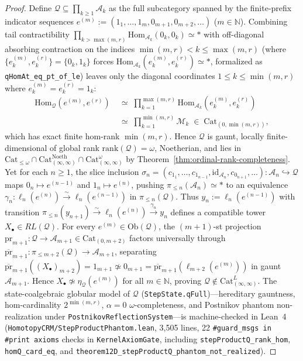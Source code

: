 \documentclass[10pt,twoside,openright]{book}
\theoremstyle{crmplain}
\theoremstyle{crmdef}
\theoremstyle{crmremark}
\begin{document}
\begin{proof}
Define $\mathcal{Q} \subseteq \prod_{k \ge 1} \mathcal{A}_k$ as the full subcategory spanned by the finite-prefix indicator sequences $e^{(m)} := (1_1, \dots, 1_m, 0_{m+1}, 0_{m+2}, \dots)$ ($m \in \mathbb{N}$). Combining tail contractibility $\prod_{k > \max(m, r)} \mathrm{Hom}_{\mathcal{A}_k}(0_k, 0_k) \simeq *$ with off-diagonal absorbing contraction on the indices $\min(m, r) < k \le \max(m, r)$ (where $\{e^{(m)}_k, e^{(r)}_k\} = \{0_k, 1_k\}$ forces $\mathrm{Hom}_{\mathcal{A}_k}(e^{(m)}_k, e^{(r)}_k) \simeq *$, formalized as \texttt{qHomAt\_\allowbreak eq\_\allowbreak pt\_\allowbreak of\_\allowbreak le}) leaves only the diagonal coordinates $1 \le k \le \min(m, r)$ where $e^{(m)}_k = e^{(r)}_k = 1_k$:
\[
  \begin{aligned}
    \mathrm{Hom}_{\mathcal{Q}}(e^{(m)}, e^{(r)}) &\;\simeq\; \prod_{k=1}^{\max(m, r)} \mathrm{Hom}_{\mathcal{A}_k}(e^{(m)}_k, e^{(r)}_k) \\
    &\;\simeq\; \prod_{k=1}^{\min(m, r)} \mathcal{M}_k \;\in\; \mathrm{Cat}_{(0, \min(m, r))},
  \end{aligned}
\]
which has exact finite hom-rank $\min(m, r)$. Hence $\mathcal{Q}$ is gaunt, locally finite-dimensional of global rank $\mathrm{rank}(\mathcal{Q}) = \omega$, Noetherian, and lies in $\mathrm{Cat}_{\le \omega} \cap \mathrm{Cat}^{\mathrm{Noeth}}_{(\infty, \infty)} \cap \mathrm{Cat}^\omega_{(\infty, \infty)}$ by Theorem~\ref{thm:ordinal-rank-completeness}. Yet for each $n \ge 1$, the slice inclusion $\sigma_n = (c_{1_1}, \dots, c_{1_{n-1}}, \mathrm{id}_{\mathcal{A}_n}, c_{0_{n+1}}, \dots) : \mathcal{A}_n \hookrightarrow \mathcal{Q}$ maps $0_n \mapsto e^{(n-1)}$ and $1_n \mapsto e^{(n)}$, pushing $\pi_{\le n}(\mathcal{A}_n) \simeq *$ to an equivalence $\gamma_n : \ell_n(e^{(n)}) \xrightarrow{\sim} \ell_n(e^{(n-1)})$ in $\pi_{\le n}(\mathcal{Q})$. Thus $y_n := \ell_n(e^{(n-1)})$ with transition $\pi_{\le n}(y_{n+1}) \xrightarrow{\sim} \ell_n(e^{(n)}) \xrightarrow{\gamma_n} y_n$ defines a compatible tower $X_\bullet \in RL(\mathcal{Q})$. For every $e^{(m)} \in \mathrm{Ob}(\mathcal{Q})$, the $(m+1)$-st projection $\mathrm{pr}_{m+1} : \mathcal{Q} \to \mathcal{A}_{m+1} \in \mathrm{Cat}_{(0, m+2)}$ factors universally through $\overline{\mathrm{pr}}_{m+1} : \pi_{\le m+2}(\mathcal{Q}) \to \mathcal{A}_{m+1}$, separating $\overline{\mathrm{pr}}_{m+1}((X_\bullet)_{m+2}) = 1_{m+1} \not\simeq 0_{m+1} = \overline{\mathrm{pr}}_{m+1}(\ell_{m+2}(e^{(m)}))$ in gaunt $\mathcal{A}_{m+1}$. Hence $X_\bullet \not\simeq \eta_{\mathcal{Q}}(e^{(m)})$ for all $m \in \mathbb{N}$, proving $\mathcal{Q} \notin \mathrm{Cat}^L_{(\infty, \infty)}$. The state-coalgebraic globular model of $\mathcal{Q}$ (\texttt{StepState.qFull})---hereditary gauntness, hom-cardinality $2^{\min(m,r)}$, $\alpha = 0$ $\omega$-completeness, and Postnikov phantom non-realization under \texttt{PostnikovReflectionSystem}---is machine-checked in Lean~4 (\texttt{HomotopyCRM/\allowbreak StepProduct\allowbreak Phantom.lean}, 3,505 lines, 22 \texttt{\#guard\_msgs in \#print axioms} checks in \texttt{KernelAxiomGate}, including \texttt{stepProductQ\_\allowbreak rank\_\allowbreak hom}, \texttt{homQ\_\allowbreak card\_\allowbreak eq}, and \texttt{theorem12D\_\allowbreak stepProductQ\_\allowbreak phantom\_\allowbreak not\_\allowbreak realized}).

\end{proof}
\end{document}

